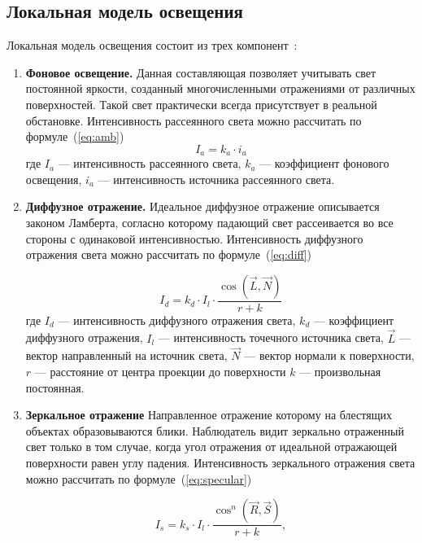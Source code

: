 \subsection{Локальная модель освещения}
Локальная модель освещения состоит из трех компонент~\cite{Phong1975}:

\begin{enumerate}[label=\arabic*)]
	\item \textbf{Фоновое освещение.} Данная составляющая позволяет учитывать свет постоянной яркости, созданный многочисленными отражениями от различных поверхностей. Такой свет практически всегда присутствует в реальной обстановке. Интенсивность  рассеянного света можно рассчитать по формуле~(\ref{eq:amb})
	\begin{equation}\label{eq:amb}
		I_{a} = k_{a} \cdot i_{a}
	\end{equation}
	\noindent где 
	$I_{a}$ --- интенсивность рассеянного света, 
	$k_{a}$ --- коэффициент фонового освещения, 
	$i_{a}$ --- интенсивность источника рассеянного света. 
	
	\item \textbf{Диффузное отражение.} Идеальное диффузное отражение описывается законом Ламберта, согласно которому падающий свет рассеивается во все стороны с одинаковой интенсивностью. Интенсивность диффузного отражения света можно рассчитать по формуле~(\ref{eq:diff})
	
	\begin{equation}\label{eq:diff}
		I_{d} = k_{d} \cdot I_{l} \cdot \frac{\cos(\overrightarrow{L}, \overrightarrow{N})}{r + k}
	\end{equation}
	\noindent где 
	$I_{d}$ --- интенсивность диффузного отражения света, 
	$k_{d}$ --- коэффициент диффузного отражения, 
	$I_{l}$ --- интенсивность точечного источника света,
	$\overrightarrow{L}$ --- вектор направленный на источник света, 
	$\overrightarrow{N}$ --- вектор нормали к поверхности,
	$r$ --- расстояние от центра проекции до поверхности
	$k$ --- произвольная постоянная.
	
	\item \textbf{Зеркальное отражение} Направленное отражение которому на блестящих объектах образовываются блики. Наблюдатель видит зеркально отраженный свет только в том случае, когда угол отражения от идеальной отражающей поверхности равен углу падения. Интенсивность зеркального отражения света можно рассчитать по формуле~(\ref{eq:specular})
	
	\begin{equation}\label{eq:specular}
		I_{s} = k_{s} \cdot I_{l} \cdot \frac{\cos^n(\overrightarrow{R}, \overrightarrow{S})}{r + k},
	\end{equation}
	

\end{enumerate}
